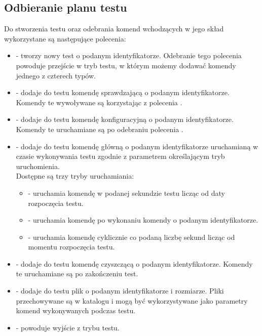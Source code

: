 \documentclass[00-praca-magisterska.tex]{subfiles}
\begin{document}
\subsection{Odbieranie planu testu}
\label{arete-slave-odbieranie-planu-testu}

Do stworzenia testu oraz odebrania komend wchodzących w jego skład wykorzystane
są następujące polecenia:

\begin{itemize}
  \setlength{\itemsep}{10pt}

\item{ - tworzy nowy test o podanym
identyfikatorze. Odebranie tego polecenia powoduje przejście w tryb testu, w
którym możemy dodawać komendy jednego z czterech typów.}

\item{ - dodaje do testu komendę
sprawdzającą o podanym identyfikatorze. Komendy te wywoływane są korzystając z
polecenia .}

\item{ - dodaje do testu komendę
konfiguracyjną o podanym identyfikatorze. Komendy te uruchamiane są po odebraniu
polecenia .}

\item{ -
dodaje do testu komendę główną o podanym identyfikatorze uruchamianą w czasie
wykonywania testu zgodnie z parametrem określającym tryb uruchomienia. \\

Dostępne są trzy tryby uruchamiania: \\

\begin{itemize}
  \setlength{\itemsep}{10pt}

\item{ - uruchamia komendę w podanej sekundzie testu licząc
od daty rozpoczęcia testu.}
\item{ - uruchamia komendę po wykonaniu komendy o
podanym identyfikatorze.} 
\item{ - uruchamia komendę cyklicznie co podaną liczbę
sekund licząc od momentu rozpoczęcia testu.}

\end{itemize}}

\item{ - dodaje do testu komendę
czyszczącą o podanym identyfikatorze. Komendy te uruchamiane są po zakończeniu
test.}

\item{ - dodaje do testu
plik o podanym identyfikatorze i rozmiarze. Pliki przechowywane są w katalogu
 i mogą być wykorzystywane jako parametry komend wykonywanych podczas
testu.}

\item{ - powoduje wyjście z trybu testu.}

\end{itemize}
\end{document}
